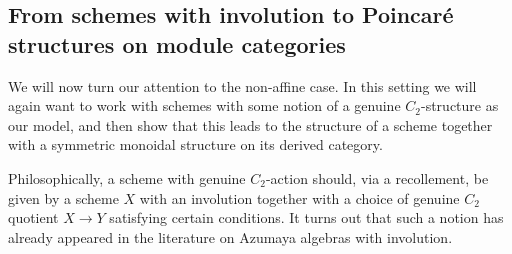 \documentclass{article}
\theoremstyle{definition}
\begin{document}

\subsection{From schemes with involution to Poincaré structures on module categories}\label{subsection:Poincare_structures_module_cats} 

We will now turn our attention to the non-affine case. In this setting we will again want to work with schemes with some notion of a genuine $C_2$-structure as our model, and then show that this leads to the structure of a scheme together with a symmetric monoidal structure on its derived category. 

Philosophically, a scheme with genuine $C_2$-action should, via a recollement, be given by a scheme $X$ with an involution together with a choice of genuine $C_2$ quotient $X\to Y$ satisfying certain conditions. It turns out that such a notion has already appeared in the literature on Azumaya algebras with involution.
\end{document}
